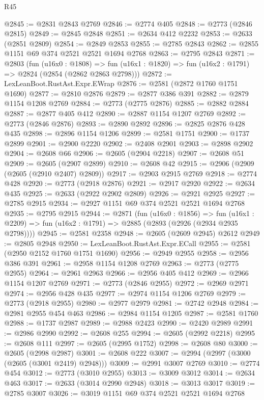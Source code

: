 \begin{lexlean}{R45}
\begin{coremodule}
@2845 := @2831 @2843 @2769
@2846 := @2774 @405
@2848 := @2773 (@2846 @2815)
@2849 := @2845 @2848
@2851 := @2634 @412 @2232
@2853 := @2633 (@2851 @2809)
@2854 := @2849 @2853
@2855 := @2785 @2843
@2862 := @2855 @1151 @69 @374 @2521 @2521 @1694 @2768
@2863 := @2795 @2843
@2871 := @2803
    (fun (u16x0 : @1808) =>
    fun (u16x1 : @1820) => fun (u16x2 : @1791) => @2824 (@2854 (@2862 @2863 @2798)))
@2872 := LexLeanBoot.RustAst.Expr.EWrap
@2876 := @2581 (@2872 @1760 @1751 @1690)
@2877 := @2810 @2876
@2879 := @2877 @386 @391
@2882 := @2879 @1154 @1208 @2769
@2884 := @2773 (@2775 @2876)
@2885 := @2882 @2884
@2887 := @2877 @405 @412
@2890 := @2887 @1154 @1207 @2769
@2892 := @2773 (@2846 @2876)
@2893 := @2890 @2892
@2896 := @2825 @2876 @428 @435
@2898 := @2896 @1154 @1206
@2899 := @2581 @1751
@2900 := @1737 @2899
@2901 := @2900 @2220
@2902 := @2408 @2901
@2903 := @2898 @2902
@2904 := @2608 @66
@2906 := @2605 (@2904 @2218)
@2907 := @2608 @51
@2909 := @2605 (@2907 @2899)
@2910 := @2608 @42
@2915 := @2906 (@2909 (@2605 (@2910 @2407) @2809))
@2917 := @2903 @2915 @2769
@2918 := @2774 @428
@2920 := @2773 (@2918 @2876)
@2921 := @2917 @2920
@2922 := @2634 @435
@2925 := @2633 (@2922 @2902 @2809)
@2926 := @2921 @2925
@2927 := @2785 @2915
@2934 := @2927 @1151 @69 @374 @2521 @2521 @1694 @2768
@2935 := @2795 @2915
@2944 := @2871
    (fun (u16x0 : @1856) =>
    fun (u16x1 : @2209) => fun (u16x2 : @1791) => @2885 (@2893 (@2926 (@2934 @2935 @2798))))
@2945 := @2581 @2358
@2948 := @2605 (@2609 @2945) @2612
@2949 := @2805 @2948
@2950 := LexLeanBoot.RustAst.Expr.ECall
@2955 := @2581 (@2950 @2152 @1760 @1751 @1690)
@2956 := @2949 @2955
@2958 := @2956 @386 @391
@2961 := @2958 @1154 @1208 @2769
@2963 := @2773 (@2775 @2955)
@2964 := @2961 @2963
@2966 := @2956 @405 @412
@2969 := @2966 @1154 @1207 @2769
@2971 := @2773 (@2846 @2955)
@2972 := @2969 @2971
@2974 := @2956 @428 @435
@2977 := @2974 @1154 @1206 @2769
@2979 := @2773 (@2918 @2955)
@2980 := @2977 @2979
@2981 := @2742 @2948
@2984 := @2981 @2955 @454 @463
@2986 := @2984 @1154 @1205
@2987 := @2581 @1760
@2988 := @1737 @2987
@2989 := @2988 @2423
@2990 := @2420 @2989
@2991 := @2986 @2990
@2992 := @2608 @255
@2994 := @2605 (@2992 @2218)
@2995 := @2608 @111
@2997 := @2605 (@2995 @1752)
@2998 := @2608 @80
@3000 := @2605 (@2998 @2987)
@3001 := @2608 @222
@3007 := @2994 (@2997 (@3000 (@2605 (@3001 @2419) @2948)))
@3009 := @2991 @3007 @2769
@3010 := @2774 @454
@3012 := @2773 (@3010 @2955)
@3013 := @3009 @3012
@3014 := @2634 @463
@3017 := @2633 (@3014 @2990 @2948)
@3018 := @3013 @3017
@3019 := @2785 @3007
@3026 := @3019 @1151 @69 @374 @2521 @2521 @1694 @2768

\end{coremodule}
\end{lexlean}
